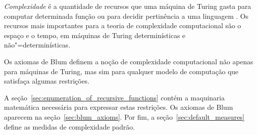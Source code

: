 \emph{Complexidade} é a quantidade de recursos
que uma máquina de Turing gasta
para computar determinada função
ou para decidir pertinência a uma linguagem
\cite[p.~285]{HopcroftUllman1979}.
Os recursos mais importantes para a teoria de complexidade computacional
são o espaço e o tempo,
em máquinas de Turing determinísticas e não"=determinísticas.

Os axiomas de Blum definem a noção de complexidade computacional
não apenas para máquinas de Turing,
mas sim para qualquer modelo de computação que satisfaça algumas restrições.

A seção~\ref{sec:enumeration_of_recursive_functions}
contém a maquinaria matemática necessária para expressar estas restrições.
Os axiomas de Blum aparecem na seção~\ref{sec:blum_axioms}.
Por fim, a seção~\ref{sec:default_measures}
define as medidas de complexidade padrão.
